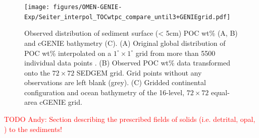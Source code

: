 \documentclass[gmd, manuscript]{copernicus}
\begin{document}
\begin{figure}[htbp]
\begin{center}
	\texttt{[image: figures/OMEN-GENIE-Exp/Seiter\_interpol\_TOCwtpc\_compare\_until3+GENIEgrid.pdf]}
	\caption{Observed distribution of sediment surface (< 5cm) POC wt\% (A, B) and cGENIE bathymetry (C). 
	(A) Original global distribution of POC wt\% interpolated on a $1^\circ \times 1^\circ$ grid from more than 5500 individual data points 
	\citep[compare][for the interpolation procedure]{seiter_organic_2004}. 
	(B) Observed POC wt\% data transformed onto the $72\times 72$ SEDGEM grid. Grid points without any observations are left blank (grey). 
	(C) Gridded continental configuration and ocean bathymetry of the 16-level, $72\times 72$ equal-area cGENIE grid.
	}\label{fig:TOC_Obs_regridded}
\end{center}
\end{figure}

\textcolor{red}{TODO Andy: Section describing the prescribed fields of solids (i.e. detrital, opal, ) to the sediments!}
\end{document}

